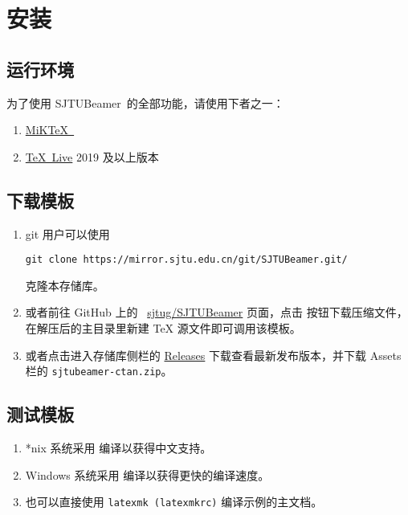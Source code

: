 \documentclass[
    UTF8,
    heading=true,
    12pt,
    a4paper
]{ctexrep}
\def\themename{\textsf{SJTUBeamer}}
\begin{document}
\chapter{安装}

\section{运行环境}

为了使用 \themename\ 的全部功能，请使用下者之一：
\begin{enumerate}
  \item \href{https://miktex.org/}{MiK\TeX\ }
  \item \href{https://mirrors.sjtug.sjtu.edu.cn/ctan/systems/texlive/Images/texlive2021-20210325.iso}{\TeX\ Live} 2019 及以上版本
\end{enumerate}

\section{下载模板}

\begin{enumerate}
  \item git 用户可以使用
        \begin{verbatim}git clone https://mirror.sjtu.edu.cn/git/SJTUBeamer.git/\end{verbatim}
        克隆本存储库。
  \item 或者前往 GitHub 上的 \faGithub{}~\href{https://github.com/sjtug/SJTUBeamer}{sjtug/SJTUBeamer} 页面，点击  按钮下载压缩文件，在解压后的主目录里新建 \TeX{} 源文件即可调用该模板。
  \item 或者点击进入存储库侧栏的 \href{https://github.com/sjtug/SJTUBeamer/releases}{\textsf{Releases}} 下载查看最新发布版本，并下载 \textsf{Assets} 栏的 \texttt{sjtubeamer-ctan.zip}。
\end{enumerate}

\section{测试模板}

\begin{enumerate}
  \item[ \faApple\ \faLinux] *nix 系统采用  编译以获得中文支持。
  \item[ \faWindows] Windows 系统采用  编译以获得更快的编译速度。
  \item[\faWrench] 也可以直接使用 \texttt{latexmk (latexmkrc)} 编译示例的主文档。
\end{enumerate}
\end{document}
